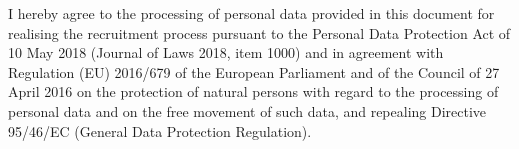 \documentclass[9pt]{style/developercv}
\begin{document}



\vspace{1.00cm}

\begin{minipage}[t]{1\textwidth}
	I hereby agree to the processing of personal data provided in this document for
	realising the recruitment process pursuant to the Personal Data Protection Act
	of 10 May 2018 (Journal of Laws 2018, item 1000) and in agreement with Regulation (EU)
	2016/679 of the European Parliament and of the Council of 27 April 2016 on the
	protection of natural persons with regard to the processing of personal data and on
	the free movement of such data, and repealing Directive 95/46/EC (General Data
	Protection Regulation).
\end{minipage}
\end{document}
